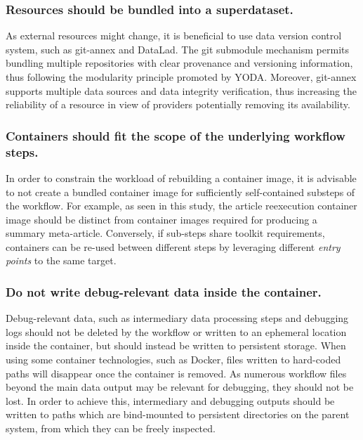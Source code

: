 \subsubsection{Resources should be bundled into a superdataset.}
As external resources might change, it is beneficial to use data version control system, such as git-annex and DataLad.
The git submodule mechanism permits bundling multiple repositories with clear provenance and versioning information, thus following the modularity principle promoted by YODA.
Moreover, git-annex supports multiple data sources and data integrity verification, thus increasing the reliability of a resource in view of providers potentially removing its availability.

\subsubsection{Containers should fit the scope of the underlying workflow steps.}
In order to constrain the workload of rebuilding a container image, it is advisable to not create a bundled container image for sufficiently self-contained substeps of the workflow.
For example, as seen in this study, the article reexecution container image should be distinct from container images required for producing a summary meta-article.
Conversely, if sub-steps share toolkit requirements, containers can be re-used between different steps by leveraging different \emph{entry points} to the same target.

\subsubsection{Do not write debug-relevant data inside the container.}
Debug-relevant data, such as intermediary data processing steps and debugging logs should not be deleted by the workflow or written to an ephemeral location inside the container, but should instead be written to persistent storage.
When using some container technologies, such as Docker, files written to hard-coded paths will disappear once the container is removed.
As numerous workflow files beyond the main data output may be relevant for debugging, they should not be lost.
In order to achieve this, intermediary and debugging outputs should be written to paths which are bind-mounted to persistent directories on the parent system, from which they can be freely inspected.

